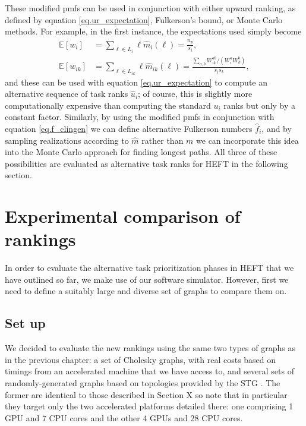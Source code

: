 \documentclass[12pt]{article}
\def\E{\mathbb{E}}
\begin{document}
These modified pmfs can be used in conjunction with either upward ranking, as defined by equation \eqref{eq.ur_expectation}, Fulkerson's bound, or Monte Carlo methods. For example, in the first instance, the expectations used simply become 
\begin{align}
\E[w_i] &= \sum_{\ell \in L_i} \ell \hat{m}_i(\ell) = \frac{n_p}{s_i}, \label{eq.expected_node_wm}\\
\E[w_{ik}] &= \sum_{\ell \in L_{ik}} \ell \hat{m}_{ik}(\ell) = \frac{\sum_{a, b} W_{ik}^{ab} / (W_i^a W_k^b)}{s_i s_k} \label{eq.expected_edge_wm},
\end{align}
and these can be used with equation \eqref{eq.ur_expectation} to compute an alternative sequence of task ranks $\hat{u}_i$; of course, this is slightly more computationally expensive than computing the standard $u_i$ ranks but only by a constant factor. Similarly, by using the modified pmfs in conjunction with equation \eqref{eq.f_clingen} we can define alternative Fulkerson numbers $\hat{f}_i$, and by sampling realizations according to $\hat{m}$ rather than $m$ we can incorporate this idea into the Monte Carlo approach for finding longest paths. All three of these possibilities are evaluated as alternative task ranks for HEFT in the following section.


\section{Experimental comparison of rankings}
\label{sect.experimental_rankings}

In order to evaluate the alternative task prioritization phases in HEFT that we have outlined so far, we make use of our software simulator. However, first we need to define a suitably large and diverse set of graphs to compare them on. 

\subsection{Set up}
\label{subsect.graphs}

We decided to evaluate the new rankings using the same two types of graphs as in the previous chapter: a set of Cholesky graphs, with real costs based on timings from an accelerated machine that we have access to, and several sets of randomly-generated graphs based on topologies provided by the STG \cite{tob02}. The former are identical to those described in Section X so note that in particular they target only the two accelerated platforms detailed there: one comprising 1 GPU and 7 CPU cores and the other 4 GPUs and 28 CPU cores.
\end{document}
